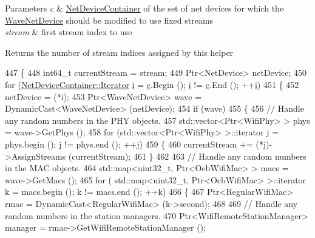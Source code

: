 \begin{DoxyParams}{Parameters}
{\em c} & \hyperlink{classns3_1_1NetDeviceContainer}{Net\+Device\+Container} of the set of net devices for which the \hyperlink{classns3_1_1WaveNetDevice}{Wave\+Net\+Device} should be modified to use fixed streams \\
\hline
{\em stream} & first stream index to use \\
\hline
\end{DoxyParams}
\begin{DoxyReturn}{Returns}
the number of stream indices assigned by this helper 
\end{DoxyReturn}

\begin{DoxyCode}
447 \{
448   int64\_t currentStream = stream;
449   Ptr<NetDevice> netDevice;
450   \textcolor{keywordflow}{for} (\hyperlink{classns3_1_1NetDeviceContainer_a45709bb572f975569ed985fa89b132f8}{NetDeviceContainer::Iterator} \hyperlink{bernuolliDistribution_8m_a6f6ccfcf58b31cb6412107d9d5281426}{i} = \hyperlink{lte_2model_2fading-traces_2fading__trace__generator_8m_ae0323a9039add2978bf5b49550572c7c}{c}.Begin (); 
      \hyperlink{bernuolliDistribution_8m_a6f6ccfcf58b31cb6412107d9d5281426}{i} != \hyperlink{lte_2model_2fading-traces_2fading__trace__generator_8m_ae0323a9039add2978bf5b49550572c7c}{c}.End (); ++\hyperlink{bernuolliDistribution_8m_a6f6ccfcf58b31cb6412107d9d5281426}{i})
451     \{
452       netDevice = (*i);
453       Ptr<WaveNetDevice> wave = DynamicCast<WaveNetDevice> (netDevice);
454       \textcolor{keywordflow}{if} (wave)
455         \{
456           \textcolor{comment}{// Handle any random numbers in the PHY objects.}
457           std::vector<Ptr<WifiPhy> > phys = wave->GetPhys ();
458           \textcolor{keywordflow}{for} (std::vector<Ptr<WifiPhy> >::iterator j = phys.begin (); j != phys.end (); ++j)
459             \{
460               currentStream += (*j)->AssignStreams (currentStream);
461             \}
462 
463           \textcolor{comment}{// Handle any random numbers in the MAC objects.}
464           std::map<uint32\_t, Ptr<OcbWifiMac> > macs = wave->GetMacs ();
465           \textcolor{keywordflow}{for} ( std::map<uint32\_t, Ptr<OcbWifiMac> >::iterator k = macs.begin (); k != macs.end (); ++k)
466             \{
467               Ptr<RegularWifiMac> rmac = DynamicCast<RegularWifiMac> (k->second);
468 
469               \textcolor{comment}{// Handle any random numbers in the station managers.}
470               Ptr<WifiRemoteStationManager> manager = rmac->GetWifiRemoteStationManager ();

\end{DoxyCode}
